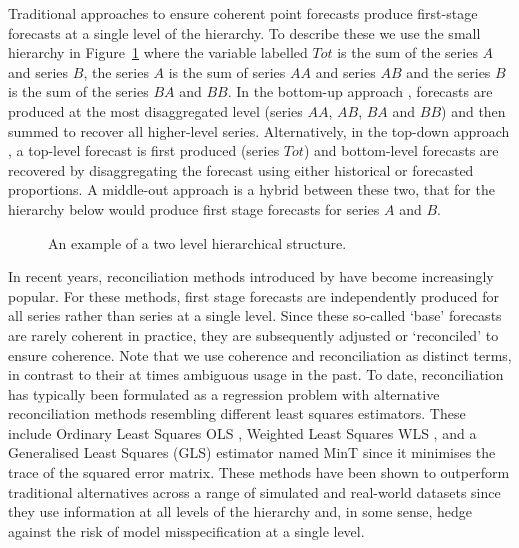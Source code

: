 \documentclass[12pt]{article}
\theoremstyle{definition}
\begin{document}
Traditional approaches to ensure coherent point forecasts produce first-stage forecasts at a single level of the hierarchy. To describe these we use the small hierarchy in Figure~\ref{fig1} where the variable labelled $Tot$ is the sum of the series $A$ and series $B$, the series $A$ is the sum of series $AA$ and series $AB$ and the series $B$ is the sum of the series $BA$ and $BB$. In the bottom-up approach \citep{Dunn1976}, forecasts are produced at the most disaggregated level (series $AA$, $AB$, $BA$ and $BB$) and then summed to recover all higher-level series. Alternatively, in the top-down approach \citep{Gross1990}, a top-level forecast is first produced (series $Tot$) and bottom-level forecasts are recovered by disaggregating the forecast using either historical or forecasted proportions. A middle-out approach is a hybrid between these two, that for the hierarchy below would produce first stage forecasts for series $A$ and $B$.

\begin{figure}[H]
	\begin{center}
		 
		 
		\qobitree
	\end{center}
	\caption{An example of a two level hierarchical structure.}\label{fig1}
\end{figure}

In recent years, reconciliation methods introduced by \citet{Hyndman2011} have become increasingly popular. For these methods, first stage forecasts are independently produced for all series rather than series at a single level. Since these so-called `base' forecasts are rarely coherent in practice, they are subsequently adjusted or `reconciled' to ensure coherence.  Note that we use coherence and reconciliation as distinct terms, in contrast to their at times ambiguous usage in the past. To date, reconciliation has typically been formulated as a regression problem with alternative reconciliation methods resembling different least squares estimators. These include Ordinary Least Squares {OLS} \citep{AthEtAl2009}, Weighted Least Squares {WLS} \citep{AthEtAl2017}, and a Generalised Least Squares (GLS) estimator \citep{Wickramasuriya2017} named MinT since it minimises the trace of the squared error matrix. These methods have been shown to outperform traditional alternatives across a range of simulated and real-world datasets \citep{Hyndman2011,VanErven2015a,Wickramasuriya2017} since they use information at all levels of the hierarchy and, in some sense, hedge against the risk of model misspecification at a single level.
\end{document}
